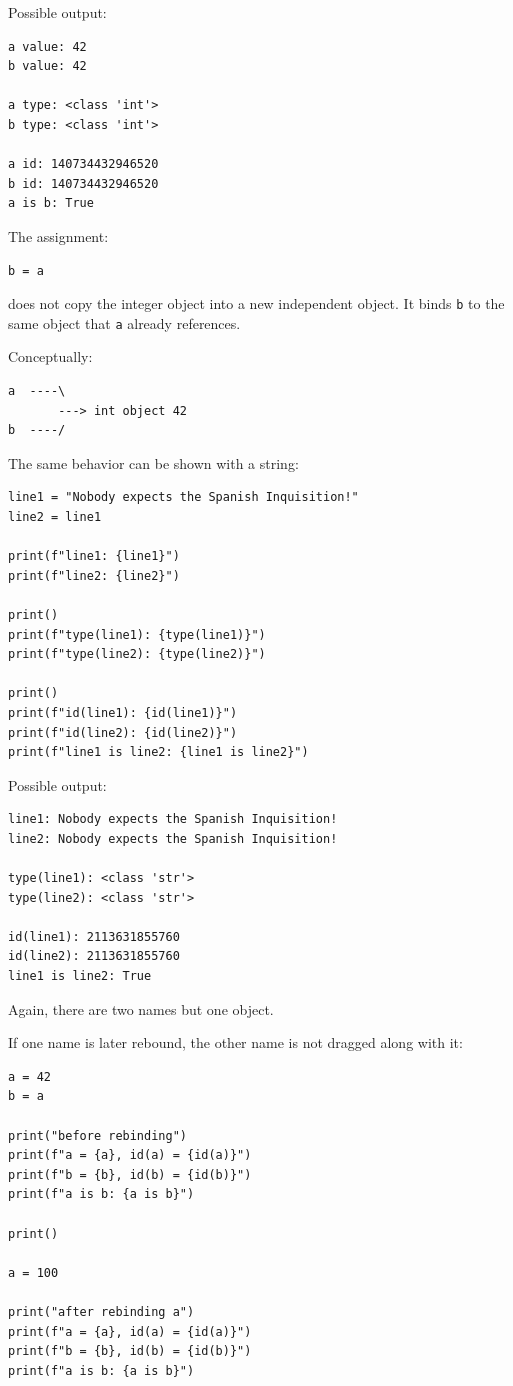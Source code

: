 Possible output:

\begin{verbatim}
a value: 42
b value: 42

a type: <class 'int'>
b type: <class 'int'>

a id: 140734432946520
b id: 140734432946520
a is b: True
\end{verbatim}

The assignment:

\begin{verbatim}
b = a
\end{verbatim}

does not copy the integer object into a new independent object. It binds \texttt{b} to the same object that \texttt{a} already references.

Conceptually:

\begin{verbatim}
a  ----\
       ---> int object 42
b  ----/
\end{verbatim}

The same behavior can be shown with a string:

\begin{verbatim}
line1 = "Nobody expects the Spanish Inquisition!"
line2 = line1

print(f"line1: {line1}")
print(f"line2: {line2}")

print()
print(f"type(line1): {type(line1)}")
print(f"type(line2): {type(line2)}")

print()
print(f"id(line1): {id(line1)}")
print(f"id(line2): {id(line2)}")
print(f"line1 is line2: {line1 is line2}")
\end{verbatim}

Possible output:

\begin{verbatim}
line1: Nobody expects the Spanish Inquisition!
line2: Nobody expects the Spanish Inquisition!

type(line1): <class 'str'>
type(line2): <class 'str'>

id(line1): 2113631855760
id(line2): 2113631855760
line1 is line2: True
\end{verbatim}

Again, there are two names but one object.

If one name is later rebound, the other name is not dragged along with it:

\begin{verbatim}
a = 42
b = a

print("before rebinding")
print(f"a = {a}, id(a) = {id(a)}")
print(f"b = {b}, id(b) = {id(b)}")
print(f"a is b: {a is b}")

print()

a = 100

print("after rebinding a")
print(f"a = {a}, id(a) = {id(a)}")
print(f"b = {b}, id(b) = {id(b)}")
print(f"a is b: {a is b}")
\end{verbatim}


